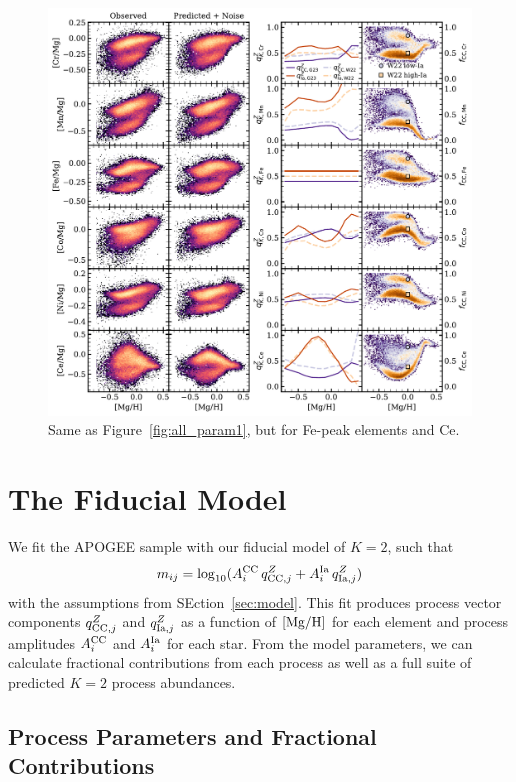 \documentclass[modern]{aastex631}
\newcommand{\mgh}{[{\rm Mg}/{\rm H}]}
\newcommand{\qcc}{q_{{\rm CC,}j}^{Z}}
\newcommand{\qIa}{q_{{\rm Ia,}j}^{Z}}
\newcommand{\Acc}{A^{\rm CC}_{i}}
\newcommand{\AIa}{A^{\rm Ia}_{i}}
\begin{document}
\begin{figure}[htb!]
    \centering
    \includegraphics[width=\textwidth]{Paper/Figures/all_param2.pdf}
    \caption{Same as Figure~\ref{fig:all_param1}, but for Fe-peak elements and Ce.}
    \label{fig:all_param2}
\end{figure}


\section{The Fiducial Model} \label{sec:fiducial}

We fit the APOGEE sample with our fiducial model of $K=2$, such that
\begin{equation}\label{eq:m_ij}
    m_{ij} = \log_{10}(A_i^{\rm CC} \, q_{{\rm CC},j}^Z + A_i^{\rm Ia} \, q_{{\rm Ia},j}^Z)
\end{equation}
with the assumptions from SEction~\ref{sec:model}. This fit produces process vector components $\qcc$ and $\qIa$ as a function of $\mgh$ for each element and process amplitudes $\Acc$ and $\AIa$ for each star. From the model parameters, we can calculate fractional contributions from each process as well as a full suite of predicted $K=2$ process abundances.

\subsection{Process Parameters and Fractional Contributions} \label{subsec:parameters}
\end{document}
